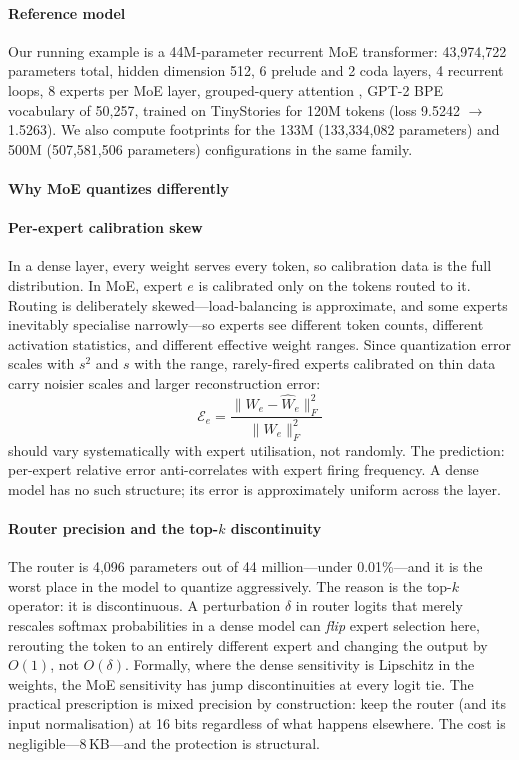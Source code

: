 \paragraph{Reference model}

Our running example is a 44M-parameter recurrent MoE transformer:
43,974,722 parameters total, hidden dimension 512, 6 prelude and 2 coda
layers, 4 recurrent loops, 8 experts per MoE layer, grouped-query
attention \citep{ainslie2023gqa}, GPT-2 BPE vocabulary of 50,257,
trained on TinyStories \citep{eldan2023tinystories} for 120M tokens
(loss 9.5242 $\rightarrow$ 1.5263). We also compute footprints for the
133M (133,334,082 parameters) and 500M (507,581,506 parameters)
configurations in the same family.

\paragraph{Why MoE quantizes differently}

\paragraph{Per-expert calibration skew}

In a dense layer, every weight serves every token, so calibration data
is the full distribution. In MoE, expert $e$ is calibrated only on the
tokens routed to it. Routing is deliberately skewed---load-balancing is
approximate, and some experts inevitably specialise narrowly---so
experts see different token counts, different activation statistics,
and different effective weight ranges. Since quantization error scales
with $s^2$ and $s$ with the range, rarely-fired experts calibrated on
thin data carry noisier scales and larger reconstruction error:
\begin{equation}
\mathcal{E}_e = \frac{\|W_e - \hat{W}_e\|_F^2}{\|W_e\|_F^2}
\end{equation}
should vary systematically with expert utilisation, not randomly. The
prediction: per-expert relative error anti-correlates with expert
firing frequency. A dense model has no such structure; its error is
approximately uniform across the layer.

\paragraph{Router precision and the top-$k$ discontinuity}
\label{sec:router-disc}

The router is 4,096 parameters out of 44 million---under 0.01\%---and
it is the worst place in the model to quantize aggressively. The reason
is the top-$k$ operator: it is discontinuous. A perturbation
$\delta$ in router logits that merely rescales softmax probabilities
in a dense model can \emph{flip} expert selection here, rerouting the
token to an entirely different expert and changing the output by
$O(1)$, not $O(\delta)$. Formally, where the dense sensitivity is
Lipschitz in the weights, the MoE sensitivity has jump
discontinuities at every logit tie. The practical prescription is
mixed precision by construction: keep the router (and its input
normalisation) at 16 bits regardless of what happens elsewhere. The
cost is negligible---8\,KB---and the protection is structural.

